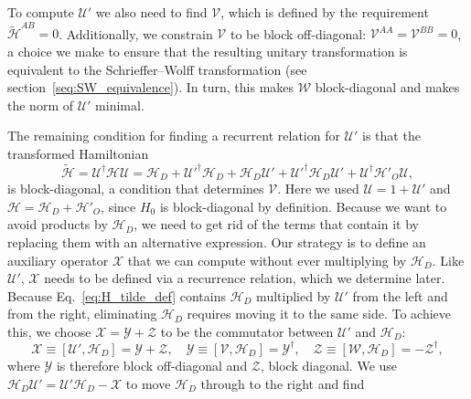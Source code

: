 To compute $\mathcal{U}'$ we also need to find $\mathcal{V}$, which is defined by the requirement $\tilde{\mathcal{H}}^{AB} = 0$.
Additionally, we constrain $\mathcal{V}$ to be block off-diagonal: $\mathcal{V}^{AA} = \mathcal{V}^{BB} = 0$, a choice we make to ensure that the resulting unitary transformation is equivalent to the Schrieffer--Wolff transformation (see section~\ref{seq:SW_equivalence}).
In turn, this makes $\mathcal{W}$ block-diagonal and makes the norm of $\mathcal{U}'$ minimal.

The remaining condition for finding a recurrent relation for $\mathcal{U}'$ is that the transformed Hamiltonian
%
\begin{equation}
\label{eq:H_tilde_def}
\tilde{\mathcal{H}} = \mathcal{U}^\dagger \mathcal{H} \mathcal{U} = \mathcal{H}_{D} +
\mathcal{U}'^\dagger \mathcal{H}_{D} + \mathcal{H}_{D} \mathcal{U}' + \mathcal{U}'^\dagger \mathcal{H}_{D}
\mathcal{U}' + \mathcal{U}^\dagger\mathcal{H}'_{O}\mathcal{U},
\end{equation}
%
is block-diagonal, a condition that determines $\mathcal{V}$.
Here we used $\mathcal{U}=1+\mathcal{U}'$ and $\mathcal{H} = \mathcal{H}_{D} + \mathcal{H}'_{O}$, since $H_0$ is block-diagonal by definition.
Because we want to avoid products by $\mathcal{H}_{D}$, we need to get rid of the terms that contain it by replacing them with an alternative expression.
Our strategy is to define an auxiliary operator $\mathcal{X}$ that we can compute without ever multiplying by $\mathcal{H}_{D}$.
Like $\mathcal{U}'$, $\mathcal{X}$ needs to be defined via a recurrence relation, which we determine later.
Because Eq.~\eqref{eq:H_tilde_def} contains $\mathcal{H}_{D}$ multiplied by $\mathcal{U}'$ from the left and from the right, eliminating $\mathcal{H}_{D}$ requires moving it to the same side.
To achieve this, we choose $\mathcal{X}=\mathcal{Y}+\mathcal{Z}$ to be the commutator between $\mathcal{U}'$ and $\mathcal{H}_{D}$:
%
\begin{equation}
\label{eq:XYZ}
\mathcal{X} \equiv [\mathcal{U}', \mathcal{H}_{D}] = \mathcal{Y} + \mathcal{Z}, \quad
\mathcal{Y} \equiv [\mathcal{V}, \mathcal{H}_{D}] = \mathcal{Y}^\dagger,\quad
\mathcal{Z} \equiv [\mathcal{W}, \mathcal{H}_{D}] = -\mathcal{Z}^\dagger,
\end{equation}
%
where $\mathcal{Y}$ is therefore block off-diagonal and $\mathcal{Z}$, block diagonal.
We use $\mathcal{H}_{D} \mathcal{U}' = \mathcal{U}' \mathcal{H}_{D} -\mathcal{X}$ to move $\mathcal{H}_{D}$ through to the right and find
